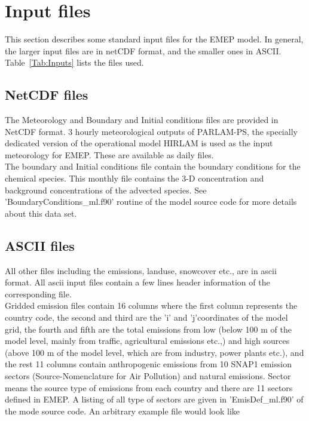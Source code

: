 \chapter{Input files}

This section describes some standard input files for the
EMEP model. In general, the larger input files
are in netCDF format, and the smaller ones in ASCII.
Table~\ref{Tab:Inputs} lists the files used.

\section{NetCDF files}

The Meteorology and Boundary and Initial conditions files are provided
in NetCDF format.  3 hourly meteorological outputs of PARLAM-PS, the
specially dedicated version of the 
operational model HIRLAM is used as the input
meteorology for EMEP.  These are available as daily files. \\

The boundary and Initial conditions file contain the boundary
conditions for the chemical species.  This monthly file contains the
3-D concentration and background concentrations  of the advected
species.  See 'BoundaryConditions\_ml.f90' routine of the model source
code for more details about this data set.  

\section{ASCII files}

All other files including the emissions, landuse, snowcover etc., are
in ascii format.  All ascii input files contain a few lines header
information of the corresponding file.   \\

Gridded emission files contain 16 columns where the first column
represents the country code, the second and third are the 'i' and 'j'coordinates of the model grid, the fourth and fifth are the total emissions from
low (below 100 m of the model level, mainly from traffic,
agricultural emissions etc.,) and high sources (above 100 m of the
model level, which are from industry, power plants etc.),
and the rest 11 columns contain anthropogenic emissions from 10 SNAP1
emission sectors (Source-Nomenclature for Air Pollution) and natural emissions. Sector means
the source type of emissions from each country and there are 11
sectors defined in EMEP.  A listing of all type
of sectors are given in 'EmisDef\_ml.f90' of the mode source code.   An arbitrary
example file would look like  \\

